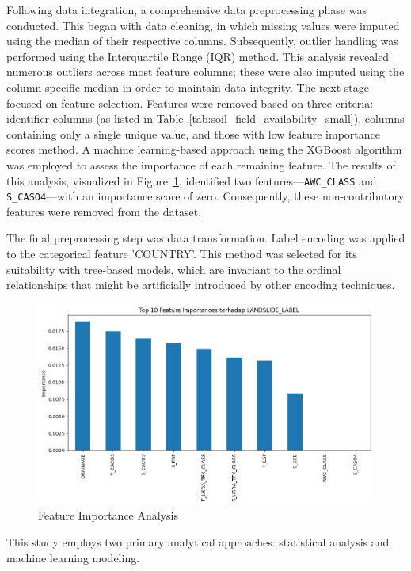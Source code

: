 Following data integration, a comprehensive data preprocessing phase was conducted. This began with data cleaning, in which missing values were imputed using the median of their respective columns. Subsequently, outlier handling was performed using the Interquartile Range (IQR) method\cite{mthd01}. This analysis revealed numerous outliers across most feature columns; these were also imputed using the column-specific median in order to maintain data integrity.
The next stage focused on feature selection. Features were removed based on three criteria: identifier columns (as listed in Table~\ref{tab:soil_field_availability_small}), columns containing only a single unique value, and those with low feature importance scores method. A machine learning-based approach using the XGBoost algorithm was employed to assess the importance of each remaining feature\cite{mthd02}. The results of this analysis, visualized in Figure~\ref{fig:feature-importance}, identified two features—\texttt{AWC\_CLASS} and \texttt{S\_CASO4}—with an importance score of zero. Consequently, these non-contributory features were removed from the dataset.

The final preprocessing step was data transformation. Label encoding was applied to the categorical feature 'COUNTRY'. This method was selected for its suitability with tree-based models, which are invariant to the ordinal relationships that might be artificially introduced by other encoding techniques\cite{mthd03}. 
\begin{figure}[htbp]
    \centerline{\includegraphics[width=\linewidth]{fig4.png}}
    \caption{Feature Importance Analysis}
    \label{fig:feature-importance}
\end{figure}
This study employs two primary analytical approaches: statistical analysis and machine learning modeling.

